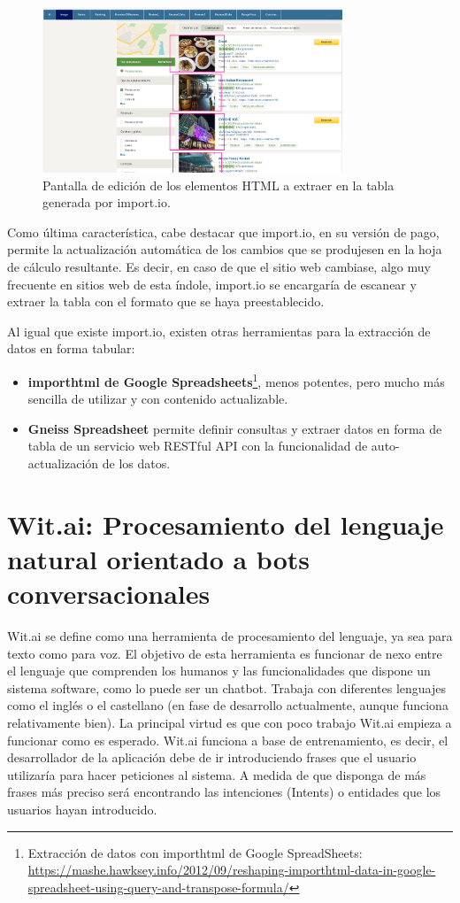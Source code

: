 \begin{figure}[htb]
	\centering
	\includegraphics[width=0.8\textwidth]{./figs/ImportioEdit.png}
	\caption{Pantalla de edición de los elementos HTML a extraer en la tabla generada por import.io.}
	\label{fig:ImportioEdit}
\end{figure}

Como última característica, cabe destacar que import.io, en su versión de pago, permite la actualización automática de los cambios que se produjesen en la hoja de cálculo resultante. Es decir, en caso de que el sitio web cambiase, algo muy frecuente en sitios web de esta índole, import.io se encargaría de escanear y extraer la tabla con el formato que se haya preestablecido.

Al igual que existe import.io, existen otras herramientas para la extracción de datos en forma tabular:
\begin{itemize}
	\item \textbf{importhtml de Google Spreadsheets}\footnote{Extracción de datos con importhtml de Google SpreadSheets: \url{https://mashe.hawksey.info/2012/09/reshaping-importhtml-data-in-google-spreadsheet-using-query-and-transpose-formula/}}, menos potentes, pero mucho más sencilla de utilizar y con contenido actualizable.
	\item \textbf{Gneiss Spreadsheet} permite definir consultas y extraer datos en forma de tabla de un servicio web RESTful API \cite{Chang2014} con la funcionalidad de auto-actualización de los datos.
\end{itemize}

\chapter{Wit.ai: Procesamiento del lenguaje natural orientado a bots conversacionales}
\label{anx:witai}

Wit.ai se define como una herramienta de procesamiento del lenguaje, ya sea para texto como para voz. El objetivo de esta herramienta es funcionar de nexo entre el lenguaje que comprenden los humanos y las funcionalidades que dispone un sistema software, como lo puede ser un chatbot. Trabaja con diferentes lenguajes como el inglés o el castellano (en fase de desarrollo actualmente, aunque funciona relativamente bien). La principal virtud es que con poco trabajo Wit.ai empieza a funcionar como es esperado. Wit.ai funciona a base de entrenamiento, es decir, el desarrollador de la aplicación debe de ir introduciendo frases que el usuario utilizaría para hacer peticiones al sistema. A medida de que disponga de más frases más preciso será encontrando las intenciones (Intents) o entidades que los usuarios hayan introducido.

